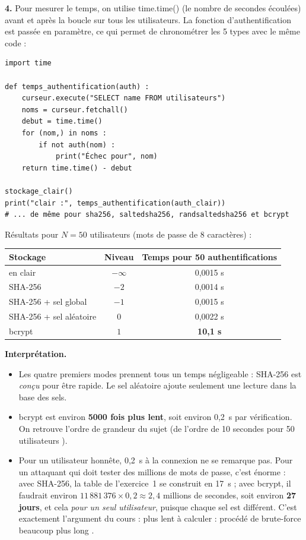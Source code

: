 \documentclass[11pt,a4paper]{article}
\newcommand{\code}[1]{\colorbox{fondcode}{\ttfamily\small #1}}
\begin{document}
\textbf{4.} Pour mesurer le temps, on utilise \code{time.time()} (le nombre de secondes écoulées) avant et après la boucle sur tous les utilisateurs. La fonction d'authentification est passée en paramètre, ce qui permet de chronométrer les 5 types avec le même code :

\begin{lstlisting}
import time

def temps_authentification(auth) :
    curseur.execute("SELECT name FROM utilisateurs")
    noms = curseur.fetchall()
    debut = time.time()
    for (nom,) in noms :
        if not auth(nom) :
            print("Échec pour", nom)
    return time.time() - debut

stockage_clair()
print("clair :", temps_authentification(auth_clair))
# ... de même pour sha256, saltedsha256, randsaltedsha256 et bcrypt
\end{lstlisting}

Résultats pour $N = 50$ utilisateurs (mots de passe de 8 caractères) :

\begin{center}
\begin{tabular}{l c c}
\toprule
\textbf{Stockage} & \textbf{Niveau} & \textbf{Temps pour 50 authentifications} \\
\midrule
en clair & $-\infty$ & 0,0015 s \\
SHA-256 & $-2$ & 0,0014 s \\
SHA-256 + sel global & $-1$ & 0,0015 s \\
SHA-256 + sel aléatoire & $0$ & 0,0022 s \\
bcrypt & $1$ & \textbf{10,1 s} \\
\bottomrule
\end{tabular}
\end{center}

\textbf{Interprétation.}
\begin{itemize}
  \item Les quatre premiers modes prennent tous un temps négligeable : SHA-256 est \emph{conçu} pour être rapide. Le sel aléatoire ajoute seulement une lecture dans la base des sels.
  \item bcrypt est environ \textbf{5000 fois plus lent}, soit environ 0,2~s par vérification. On retrouve l'ordre de grandeur du sujet (\og de l'ordre de 10 secondes pour 50 utilisateurs \fg{}).
  \item Pour un utilisateur honnête, 0,2~s à la connexion ne se remarque pas. Pour un attaquant qui doit tester des millions de mots de passe, c'est énorme : avec SHA-256, la table de l'exercice~1 se construit en 17~s ; avec bcrypt, il faudrait environ $11\,881\,376 \times 0{,}2 \approx 2{,}4$ millions de secondes, soit environ \textbf{27 jours}, et cela \emph{pour un seul utilisateur}, puisque chaque sel est différent. C'est exactement l'argument du cours : \og plus lent à calculer : procédé de brute-force beaucoup plus long \fg{}.
\end{itemize}
\end{document}
